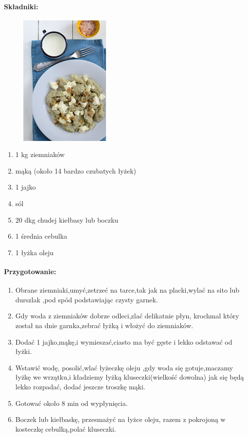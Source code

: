 \documentclass{article}
\begin{document}
    \paragraph{Składniki:}
    \begin{figure}
        \includegraphics[width=0.4\textwidth, height=0.5\textwidth]{kluski_ziemniaczane.jpg}
    \end{figure}
    \begin{enumerate}
        \item 1 kg ziemniaków
        \item mąką (około 14 bardzo czubatych łyżek)
        \item 1 jajko
        \item sól
        \item 20 dkg chudej kiełbasy lub boczku
        \item 1 średnia cebulka
        \item 1 łyżka oleju
    \end{enumerate}

    \paragraph{Przygotowanie:}
    \begin{enumerate}
        \item Obrane ziemniaki,umyć,zetrzeć na tarce,tak jak na placki,wylać na
            sito lub durszlak ,pod spód podstawiając czysty garnek.
        \item Gdy woda z ziemniaków dobrze odleci,zlać delikatnie płyn, krochmal
            który został na dnie garnka,zebrać łyżką i włożyć do ziemniaków.
        \item Dodać 1 jajko,mąkę,i wymieszać,ciasto ma być gęste i lekko odstawać od łyżki.
        \item Wstawić wodę, posolić,wlać łyżeczkę oleju ,gdy woda się
            gotuje,maczamy łyżkę we wrzątku,i kładziemy łyżką kluseczki(wielkość
            dowolna) jak się będą lekko rozpadać, dodać jeszcze troszkę mąki.
        \item Gotować około 8 min od wypłynięcia.
        \item Boczek lub kiełbaskę, przesmażyć na łyżce oleju, razem z pokrojoną
            w kosteczkę cebulką,polać kluseczki.
    \end{enumerate}
    \newpage
\end{document}

